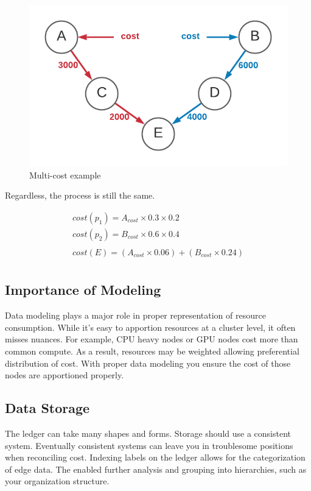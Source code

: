 \documentclass[10pt, a4paper, twocolumn]{article}
\begin{document}
    \begin{figure}[H]
      \centering
      \includegraphics[width=\linewidth]{./cost-attribution-cost-multiple.png}
      \caption{Multi-cost example}
      \label{figure:8}
    \end{figure}

    Regardless, the process is still the same.

    \begin{gather*}
      cost(p_{1}) = A_{cost} \times 0.3 \times 0.2 \\
      cost(p_{2}) = B_{cost} \times 0.6 \times 0.4 \\
      \\
      cost(E) = (A_{cost} \times 0.06) + (B_{cost} \times 0.24) \\
    \end{gather*}

  \subsection*{Importance of Modeling}
    Data modeling plays a major role in proper representation of resource consumption.
    While it's easy to apportion resources at a cluster level, it often misses nuances.
    For example, CPU heavy nodes or GPU nodes cost more than common compute.
    As a result, resources may be weighted allowing preferential distribution of cost.
    With proper data modeling you ensure the cost of those nodes are apportioned properly.

  \subsection*{Data Storage}
    The ledger can take many shapes and forms.
    Storage should use a consistent system.
    Eventually consistent systems can leave you in troublesome positions when reconciling cost.
    Indexing labels on the ledger allows for the categorization of edge data.
    The enabled further analysis and grouping into hierarchies, such as your organization structure.
\end{document}
